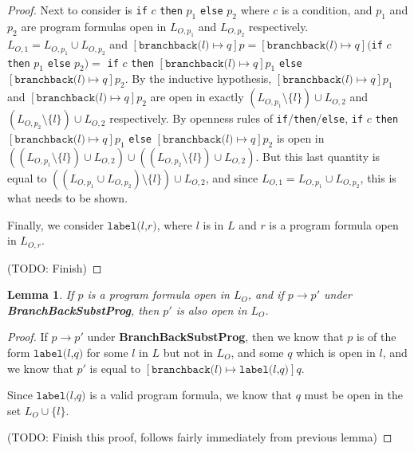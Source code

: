 \documentclass[11pt]{article}
\begin{document}
\begin{proof}
Next to consider is \texttt{if} $c$ \texttt{then} $p_{1}$ \texttt{else} $p_{2}$ where $c$ is a condition, and $p_{1}$ and $p_{2}$ are program formulas open in $L_{O,p_{1}}$ and $L_{O,p_{2}}$ respectively.  $L_{O,1} = L_{O,p_{1}} \cup L_{O,p_{2}}$ and $[\texttt{branchback(}l\texttt{)} \mapsto q]p = [\texttt{branchback(}l\texttt{)} \mapsto q]($\texttt{if} $c$ \texttt{then} $p_{1}$ \texttt{else} $p_{2}) = $ \texttt{if} $c$ \texttt{then} $[\texttt{branchback(}l\texttt{)} \mapsto q]p_{1}$ \texttt{else} $[\texttt{branchback(}l\texttt{)} \mapsto q]p_{2}$.  By the inductive hypothesis, $[\texttt{branchback(}l\texttt{)} \mapsto q]p_{1}$ and $[\texttt{branchback(}l\texttt{)} \mapsto q]p_{2}$ are open in exactly $(L_{O,p_{1}} \setminus \{l\}) \cup L_{O,2}$ and $(L_{O,p_{2}} \setminus \{l\}) \cup L_{O,2}$ respectively. By openness rules of \texttt{if}/\texttt{then}/\texttt{else}, \texttt{if} $c$ \texttt{then} $[\texttt{branchback(}l\texttt{)} \mapsto q]p_{1}$ \texttt{else} $[\texttt{branchback(}l\texttt{)} \mapsto q]p_{2}$ is open in $((L_{O,p_{1}} \setminus \{l\}) \cup L_{O,2}) \cup ((L_{O,p_{2}} \setminus \{l\}) \cup L_{O,2})$.  But this last quantity is equal to $((L_{O,p_{1}} \cup L_{O,p_{2}}) \setminus \{l\}) \cup L_{O,2}$, and since $L_{O,1} = L_{O,p_{1}} \cup L_{O,p_{2}}$, this is what needs to be shown.

Finally, we consider $\texttt{label(}l\texttt{,} r\texttt{)}$, where $l$ is in $L$ and $r$ is a program formula open in $L_{O,r}$.

(TODO: Finish)
\end{proof}

\newtheorem*{bbppreservesopenness}{Lemma}
\begin{bbppreservesopenness}
If $p$ is a program formula open in $L_{O}$, and if $p \longrightarrow p'$ under \textbf{BranchBackSubstProg}, then $p'$ is also open in $L_{O}$.
\end{bbppreservesopenness}
\begin{proof}
If $p \longrightarrow p'$ under \textbf{BranchBackSubstProg}, then we know that $p$ is of the form $\texttt{label(}l\texttt{,} q \texttt{)}$ for some $l$ in $L$ but not in $L_{O}$, and some $q$ which is open in $l$, and we know that $p'$ is equal to $[\texttt{branchback(}l\texttt{)} \mapsto \texttt{label(}l\texttt{,} q\texttt{)}]q$.

Since $\texttt{label(}l\texttt{,} q \texttt{)}$ is a valid program formula, we know that $q$ must be open in the set $L_{O} \cup \{l\}$.

(TODO: Finish this proof, follows fairly immediately from previous lemma)
\end{proof}
\end{document}
